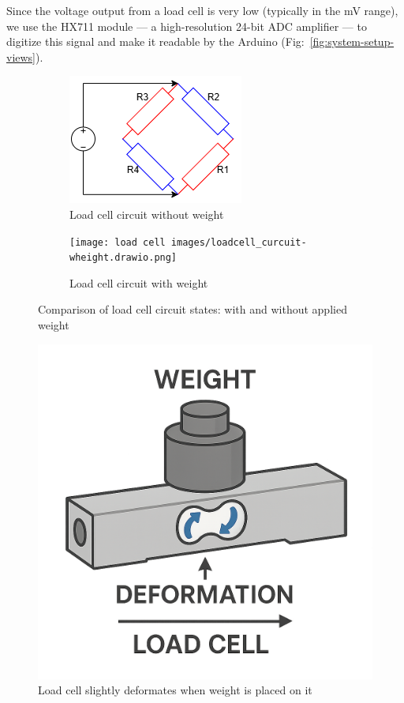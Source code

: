 Since the voltage output from a load cell is very low (typically in the mV range), we use the HX711 module — a high-resolution 24-bit ADC amplifier — to digitize this signal and make it readable by the Arduino (Fig:~\ref{fig:system-setup-views}).
\begin{figure}[H]
    \centering
    \begin{subfigure}[b]{0.45\linewidth}
        \centering
        \includegraphics[width=\linewidth]{load cell images/loadcell_curcuit-.drawio.png}
        \caption{Load cell circuit without weight}
        \label{fig:loadcell-weight}
    \end{subfigure}
    \hfill
    \begin{subfigure}[b]{0.45\linewidth}
        \centering
        \texttt{[image: load cell images/loadcell\_curcuit-wheight.drawio.png]}
        \caption{Load cell circuit with weight}
        \label{fig:loadcell-noweight}
    \end{subfigure}
    \caption{Comparison of load cell circuit states: with and without applied weight}
    \label{fig:loadcell-circuit-comparison}
\end{figure}
\begin{figure}[H]
    \centering
    \includegraphics[width=0.35\linewidth]{load cell images/load cell deformation no back.png}
    \caption{Load cell slightly deformates when weight is placed on it}
    \label{fig:loadcell_deforms}
\end{figure}

